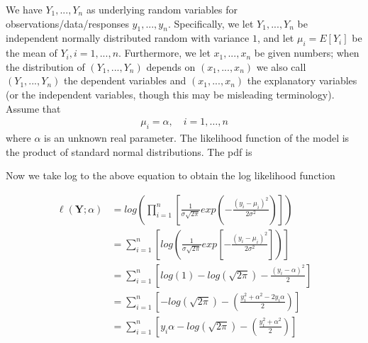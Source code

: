 \begin{example} \label{ex:model1}
We have $Y_1,...,Y_n$ as underlying random variables for observations/data/responses $y_1,...,y_n$.
Specifically, we let $Y_1,...,Y_n$ be independent normally distributed random with variance $1$, and let $\mu_i= E[Y_i]$ be the mean of $Y_i, i= 1,...,n$.
Furthermore, we let $x_1,...,x_n$ be given numbers; when the distribution of $(Y_1,...,Y_n)$ depends on $(x_1,...,x_n)$ we also call $(Y_1,...,Y_n)$ the dependent variables and $(x_1,...,x_n)$ the explanatory variables (or the independent variables, though this may be misleading terminology).
\\
Assume that
\begin{align*}
    \mu_i = \alpha, \quad i = 1, \ldots,n
\end{align*}
where $\alpha$ is an unknown real parameter. 
The likelihood function of the model is the product of standard normal distributions. The pdf is 


Now we take log to the above equation to obtain the log likelihood function

\begin{align*}
   \ell(\textbf{Y};\alpha) &= log \left( \prod_{i=1}^n \left[ \frac{1}{\sigma \sqrt{2 \pi}}exp\left(-\frac{(y_i -\mu_i)^2}{2 \sigma^2}\right) \right] \right)\\
   &= \sum_{i = 1}^n \left[ log\left( \frac{1}{\sigma \sqrt{2 \pi}}exp\left[-\frac{(y_i - \mu_i)^2}{2 \sigma^2}\right] \right) \right]\\
   &= \sum_{i = 1}^n \left[ log(1) - log(\sqrt{2 \pi}) - \frac{(y_i - \alpha)^2}{2} \right]\\
   &= \sum_{i = 1}^n \left[- log\left( \sqrt{2 \pi}\right) - \left(\frac{y_i^2 + \alpha^2 - 2y_i\alpha}{2}\right) \right]\\
   &= \sum_{i = 1}^n \left[y_i \alpha - log\left( \sqrt{2 \pi}\right) - \left( \frac{y_i^2 + \alpha^2}{2} \right) \right]
\end{align*}
\end{example}

